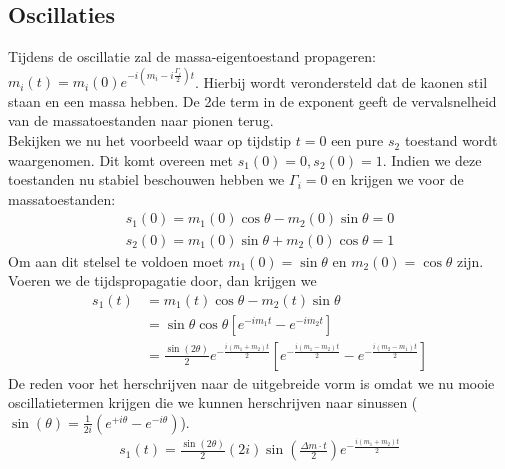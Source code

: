 \documentclass[../main.tex]{subfiles}
\begin{document}
\subsection{Oscillaties}%
\label{sub:oscillaties}

Tijdens de oscillatie zal de massa-eigentoestand propageren: $m_{i}(t)=m_{i}(0) e^{-i\left(m_{i}-i \frac{\Gamma_{i}}{2}\right) t}$. Hierbij wordt verondersteld dat de kaonen stil staan en een massa hebben. De 2de term in de exponent geeft de vervalsnelheid van de massatoestanden naar pionen terug.\\
Bekijken we nu het voorbeeld waar op tijdstip $t=0$ een pure $s_2$ toestand wordt waargenomen. Dit komt overeen met $s_{1}(0)=0, s_{2}(0)=1$. Indien we deze toestanden nu stabiel beschouwen hebben we $\Gamma_i = 0$ en krijgen we voor de massatoestanden:
\begin{equation}
    \begin{aligned}
        \label{eq:voorbeeld_osc_stable_massa}
        s_{1}(0)=m_{1}(0) \cos \theta-m_{2}(0) \sin \theta=0 \\
        s_{2}(0)=m_{1}(0) \sin \theta+m_{2}(0) \cos \theta=1
    \end{aligned}
\end{equation}
Om aan dit stelsel te voldoen moet $m_1(0) = \sin\theta$ en $m_2(0) = \cos\theta$ zijn. Voeren we de tijdspropagatie door, dan krijgen we 
\begin{equation}
    \begin{aligned}
        \label{eq:voorbeeld_osc_stable_massa_tijd_prop_1}
        s_{1}(t) &=m_{1}(t) \cos \theta-m_{2}(t) \sin \theta \\
                 &=\sin \theta \cos \theta\left[e^{-i m_{1} t}-e^{-i m_{2} t}\right] \\
                 &=\frac{\sin (2 \theta)}{2} e^{-\frac{i\left(m_{1}+m_{2}\right) t}{2}}\left[e^{-\frac{i\left(m_{1}-m_{2}\right) t}{2}}-e^{-\frac{i\left(m_{2}-m_{1}\right) t}{2}}\right]
    \end{aligned}
\end{equation}
De reden voor het herschrijven naar de uitgebreide vorm is omdat we nu mooie oscillatietermen krijgen die we kunnen herschrijven naar sinussen ($\sin (\theta) = \frac{1}{2 i}\left(e^{+i \theta}-e^{-i \theta}\right)$).
\begin{equation}
    \begin{aligned}
        \label{eq:voorbeeld_osc_stable_massa_tijd_prop_2}
        s_{1}(t)=\frac{\sin (2 \theta)}{2}(2 i) \sin \left(\frac{\Delta m \cdot t}{2}\right) e^{-\frac{i\left(m_{1}+m_{2}\right) t}{2}}
    \end{aligned}
\end{equation}
\end{document}
